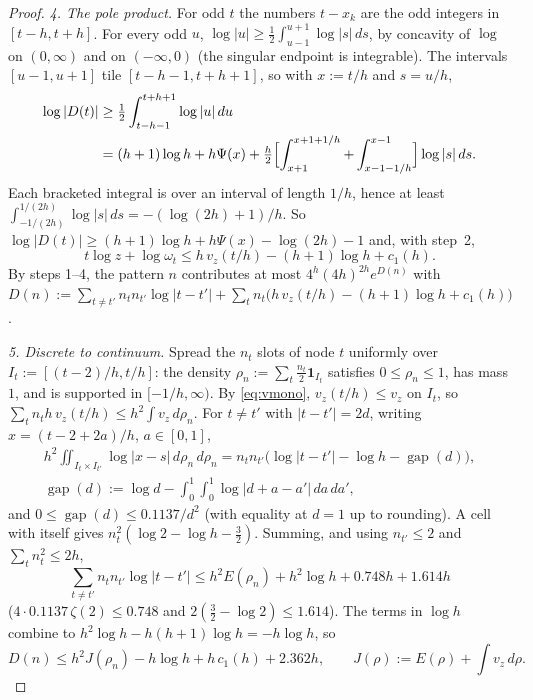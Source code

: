 \documentclass[11pt]{amsart}
\theoremstyle{definition}
\theoremstyle{remark}
\numberwithin{equation}{section}
\newcommand{\one}{\mathbf{1}}
\begin{document}
\begin{proof}
\emph{4. The pole product.} For odd $t$ the numbers $t-x_k$ are the odd integers in $[t-h,t+h]$. For every odd $u$,
$\log|u|\ge\frac12\int_{u-1}^{u+1}\log|s|\,ds$, by concavity of $\log$ on $(0,\infty)$ and on $(-\infty,0)$ (the
singular endpoint is integrable). The intervals $[u-1,u+1]$ tile $[t-h-1,t+h+1]$, so with $x:=t/h$ and $s=u/h$,
\begin{align*}
  \log|D(t)|&\ge\tfrac12\int_{t-h-1}^{t+h+1}\log|u|\,du\\
  &=(h+1)\log h+h\Psi(x)+\tfrac h2\Bigl[\int_{x+1}^{x+1+1/h}+\int_{x-1-1/h}^{x-1}\Bigr]\log|s|\,ds .
\end{align*}
Each bracketed integral is over an interval of length $1/h$, hence at least $\int_{-1/(2h)}^{1/(2h)}\log|s|\,ds=-(\log(2h)+1)/h$.
So $\log|D(t)|\ge(h+1)\log h+h\Psi(x)-\log(2h)-1$ and, with step~2,
\begin{equation}\label{eq:nodeweight}
  t\log z+\log\omega_t\le h\,v_z(t/h)-(h+1)\log h+c_1(h).
\end{equation}
By steps 1--4, the pattern $n$ contributes at most $4^h(4h)^{2h}e^{D(n)}$ with
$D(n):=\sum_{t\ne t'}n_tn_{t'}\log|t-t'|+\sum_tn_t\bigl(h\,v_z(t/h)-(h+1)\log h+c_1(h)\bigr)$.

\emph{5. Discrete to continuum.} Spread the $n_t$ slots of node $t$ uniformly over $I_t:=[(t-2)/h,t/h]$: the density
$\rho_n:=\sum_t\frac{n_t}2\one_{I_t}$ satisfies $0\le\rho_n\le1$, has mass $1$, and is supported in $[-1/h,\infty)$. By
\eqref{eq:vmono}, $v_z(t/h)\le v_z$ on $I_t$, so $\sum_tn_th\,v_z(t/h)\le h^2\int v_z\,d\rho_n$. For $t\ne t'$ with
$|t-t'|=2d$, writing $x=(t-2+2a)/h$, $a\in[0,1]$,
\begin{gather*}
  h^2\iint_{I_t\times I_{t'}}\log|x-s|\,d\rho_n\,d\rho_n=n_tn_{t'}\bigl(\log|t-t'|-\log h-\operatorname{gap}(d)\bigr),\\
  \operatorname{gap}(d):=\log d-\int_0^1\!\!\int_0^1\log|d+a-a'|\,da\,da',
\end{gather*}
and $0\le\operatorname{gap}(d)\le0.1137/d^2$ (with equality at $d=1$ up to rounding). A cell with itself gives
$n_t^2(\log2-\log h-\frac32)$. Summing, and using $n_{t'}\le2$ and $\sum_tn_t^2\le2h$,
\[
  \sum_{t\ne t'}n_tn_{t'}\log|t-t'|\le h^2E(\rho_n)+h^2\log h+0.748h+1.614h
\]
($4\cdot0.1137\,\zeta(2)\le0.748$ and $2(\frac32-\log2)\le1.614$). The terms in $\log h$ combine to
$h^2\log h-h(h+1)\log h=-h\log h$, so
\[
  D(n)\le h^2J(\rho_n)-h\log h+h\,c_1(h)+2.362h,\qquad J(\rho):=E(\rho)+\int v_z\,d\rho .
\]


\end{proof}
\end{document}
